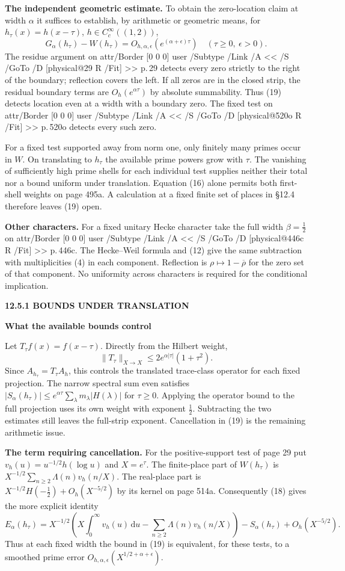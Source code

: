 \documentclass[11pt,letterpaper]{article}
\makeatletter
\newcommand{\rightmarktext}{}
\newcommand{\printfolio}{}
\newcommand{\leaf}[4]{\clearpage\gdef\printfolio{#1}\gdef\rightmarktext{#2}%
  {\small\sffamily\bfseries\color{ink}#3\par}\vspace{3pt}%
  {\LARGE\bfseries #4\par}\vspace{5pt}}
\newcommand{\point}[1]{\par\smallskip\textbf{#1.}\enspace\ignorespaces}
\newcommand{\dd}{\,\mathrm d}
\newcommand{\MusicPDFPageRef}[1]{\pdfpageref\csname physical@#1\endcsname\space\space 0 R}
\newcommand{\pagelink}[2]{\leavevmode\pdfstartlink attr{/Border [0 0 0]} user{%
  /Subtype /Link /A << /S /GoTo /D [\MusicPDFPageRef{#1} /Fit] >>}%
  {\color{ink}#2}\pdfendlink}
\newcommand{\pg}[1]{\pagelink{#1}{p.\,#1}}
\makeatother
\begin{document}
\point{The independent geometric estimate} To obtain the zero-location
claim at width $\alpha$ it suffices to establish, by arithmetic or
geometric means, for $h_\tau(x)=h(x-\tau)$, $h\in C_c^\infty((1,2))$,
\[
 G_\alpha(h_\tau)-W(h_\tau)
         =O_{h,\alpha,\epsilon}(e^{(\alpha+\epsilon)\tau})
       \quad(\tau\ge0,\ \epsilon>0).
 \tag{19}
\]
The residue argument on \pg{29} detects every zero strictly to the right
of the boundary; reflection covers the left. If all zeros are in the
closed strip, the residual boundary terms are $O_h(e^{\alpha\tau})$ by
absolute summability. Thus (19) detects location even at a width with
a boundary zero. The fixed test on \pg{520o} detects every such zero.

For a fixed test supported away from norm one, only finitely many primes
occur in $W$. On translating to $h_\tau$ the available prime powers
grow with $\tau$. The vanishing of sufficiently high prime shells for
each individual test supplies neither their total nor a bound uniform
under translation. Equation (16) alone permits both first-shell weights
on page 495a. A calculation at a fixed finite set of places in \S12.4
therefore leaves (19) open.

\point{Other characters} For a fixed unitary Hecke character take the
full width $\beta=\tfrac12$ on \pg{446c}. The Hecke--Weil formula and
(12) give the same subtraction with multiplicities (4) in each
component. Reflection is $\rho\mapsto1-\overline{\rho}$ for
the zero set of that component. No uniformity across characters is
required for the conditional implication.

\leaf{520a}{Translated tests}{12.5.1 \quad BOUNDS UNDER TRANSLATION}{What the available bounds control}
Let $T_\tau f(x)=f(x-\tau)$. Directly from the Hilbert weight,
\[
 \|T_\tau\|_{X\to X}\le 2 e^{\alpha|\tau|}(1+\tau^2).
\]
Since $A_{h_\tau}=T_\tau A_h$, this controls the translated
trace-class operator for each fixed projection. The narrow spectral sum
even satisfies $|S_\alpha(h_\tau)|\le
e^{\alpha\tau}\sum_\lambda m_\lambda |H(\lambda)|$ for $\tau\ge0$.
Applying the operator bound to the full projection uses its own weight
with exponent $\tfrac12$. Subtracting the two estimates still leaves the
full-strip exponent. Cancellation in (19) is the remaining arithmetic issue.

\point{The term requiring cancellation} For the positive-support test of
page 29 put $v_h(u)=u^{-1/2}h(\log u)$ and $X=e^\tau$. The finite-place
part of $W(h_\tau)$ is
$X^{-1/2}\sum_{n\ge2}\Lambda(n)v_h(n/X)$. The real-place part is
$X^{-1/2}H(-\tfrac12)+O_h(X^{-5/2})$ by its kernel on page 514a.
Consequently (18) gives the more explicit identity
\[
 E_\alpha(h_\tau)=
  X^{-1/2}\!\left(X\int_0^\infty v_h(u)\dd u
                -\sum_{n\ge2}\Lambda(n)v_h(n/X)\right)
       -S_\alpha(h_\tau)+O_h(X^{-5/2}).
 \tag{20}
\]
Thus at each fixed width the bound in (19) is equivalent, for these tests,
to a smoothed prime error $O_{h,\alpha,\epsilon}(X^{1/2+\alpha+\epsilon})$.
\end{document}
